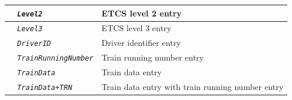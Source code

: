 \documentclass{template/openetcs}
\begin{document}
\begin{itemize}
\begin{longtable}{|l|l|l|}
			\hline
			
			&	\begin{minipage}[t]{0.40\linewidth} \emph{\texttt{Level2}} \end{minipage}
			&	\begin{minipage}[t]{0.38\linewidth} ETCS level 2 entry \end{minipage} \\
			
			\hline
			
			&	\begin{minipage}[t]{0.40\linewidth} \emph{\texttt{Level3}} \end{minipage}
			&	\begin{minipage}[t]{0.38\linewidth} ETCS level 3 entry \end{minipage} \\ 
			
			\hline
			
			&	\begin{minipage}[t]{0.40\linewidth} \emph{\texttt{DriverID}} \end{minipage}
			&	\begin{minipage}[t]{0.38\linewidth} Driver identifier entry \end{minipage} \\
			
			\hline
			
			&	\begin{minipage}[t]{0.40\linewidth} \emph{\texttt{TrainRunningNumber}} \end{minipage}
			&	\begin{minipage}[t]{0.38\linewidth} Train running number entry \end{minipage} \\
			
			\hline
			
			&	\begin{minipage}[t]{0.40\linewidth} \emph{\texttt{TrainData}} \end{minipage}
			&	\begin{minipage}[t]{0.38\linewidth} Train data entry \end{minipage} \\
			
			\hline
			
			&	\begin{minipage}[t]{0.40\linewidth} \emph{\texttt{TrainData+TRN}} \end{minipage}
			&	\begin{minipage}[t]{0.38\linewidth} Train data entry with train running number entry \end{minipage} \\
			

\end{longtable}
\end{itemize}
\end{document}
